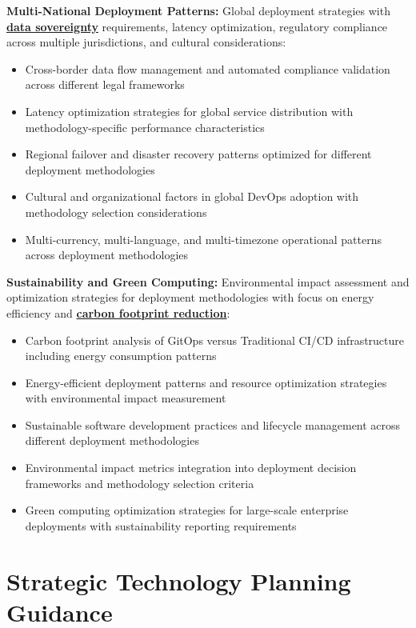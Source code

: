\textbf{Multi-National Deployment Patterns:} Global deployment strategies with \textbf{\hyperref[data_sovereignty]{data sovereignty}} requirements, latency optimization, regulatory compliance across multiple jurisdictions, and cultural considerations:
\begin{itemize}
\item Cross-border data flow management and automated compliance validation across different legal frameworks
\item Latency optimization strategies for global service distribution with methodology-specific performance characteristics
\item Regional failover and disaster recovery patterns optimized for different deployment methodologies
\item Cultural and organizational factors in global DevOps adoption with methodology selection considerations
\item Multi-currency, multi-language, and multi-timezone operational patterns across deployment methodologies
\end{itemize}

\textbf{Sustainability and Green Computing:} Environmental impact assessment and optimization strategies for deployment methodologies with focus on energy efficiency and \textbf{\hyperref[green_computing]{carbon footprint reduction}}:
\begin{itemize}
\item Carbon footprint analysis of GitOps versus Traditional CI/CD infrastructure including energy consumption patterns
\item Energy-efficient deployment patterns and resource optimization strategies with environmental impact measurement
\item Sustainable software development practices and lifecycle management across different deployment methodologies
\item Environmental impact metrics integration into deployment decision frameworks and methodology selection criteria
\item Green computing optimization strategies for large-scale enterprise deployments with sustainability reporting requirements
\end{itemize}

\section{Strategic Technology Planning Guidance}
\label{sec:strategic_guidance}


